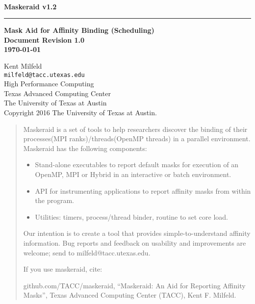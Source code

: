 \documentclass[10pt,a4paper]{report}
\begin{document}
\begin{titlepage}
\thispagestyle{empty}	%
\verb+ +
\vspace{1em}
\begin{flushright}
\huge\bf Maskeraid v1.2\\
\rule{\textwidth}{4pt}
\large{\bf Mask Aid for Affinity Binding (Scheduling)\\
Document Revision 1.0\\
\today}
\end{flushright}

\newpage
\thispagestyle{empty}
\begin{flushleft}
Kent Milfeld \\
\verb+milfeld@tacc.utexas.edu+\\
\vspace{0.5em}
High Performance Computing \\
Texas Advanced Computing Center\\
The University of Texas at Austin\\
\vspace{1cm}
Copyright 2016 The University of Texas at Austin.
\end{flushleft}
\newpage
\end{titlepage}

\begin{abstract}

Maskeraid is a set of tools to help researchers discover the binding of their processes(MPI ranks)/threads(OpenMP threads) in a parallel environment. Maskeraid has the following components:

\begin{itemize}
\item Stand-alone executables to report default masks for execution of an OpenMP, MPI or Hybrid in an interactive or batch environment.
\item API for instrumenting applications to report affinity masks from within the program.
\item Utilities: timers, process/thread binder, routine to set core load.
\end{itemize}


Our intention is to create a tool that provides simple-to-understand affinity
information. Bug reports and feedback on usability and improvements are welcome; send to milfeld@tacc.utexas.edu. 


If you use maskeraid, cite:

github.com/TACC/maskeraid, ``Maskeraid: An Aid for Reporting Affinity Masks'', Texas Advanced Computing Center (TACC), Kent F. Milfeld. \cite{maskeraid}

\end{abstract}
\end{document}
